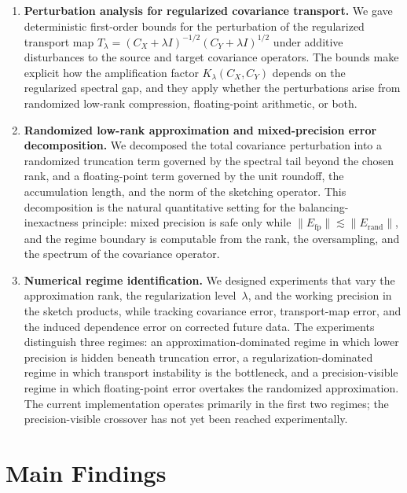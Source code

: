 \begin{enumerate}
	\item \textbf{Perturbation analysis for regularized covariance transport.}
	      We gave deterministic first-order bounds for the perturbation of the
	      regularized transport map
	      \(T_\lambda = (C_X + \lambda I)^{-1/2}(C_Y + \lambda I)^{1/2}\)
	      under additive disturbances to the source and target covariance
	      operators. The bounds make explicit how the amplification factor
	      \(K_\lambda(C_X,C_Y)\) depends on the regularized spectral gap, and
	      they apply whether the perturbations arise from randomized low-rank
	      compression, floating-point arithmetic, or both.

	\item \textbf{Randomized low-rank approximation and mixed-precision error
		      decomposition.}
	      We decomposed the total covariance perturbation into a randomized
	      truncation term governed by the spectral tail beyond the chosen rank,
	      and a floating-point term governed by the unit roundoff, the
	      accumulation length, and the norm of the sketching operator. This
	      decomposition is the natural quantitative setting for the
	      balancing-inexactness principle: mixed precision is safe only while
	      \(\|E_{\mathrm{fp}}\| \lesssim \|E_{\mathrm{rand}}\|\), and the
	      regime boundary is computable from the rank, the oversampling, and
	      the spectrum of the covariance operator.

	\item \textbf{Numerical regime identification.}
	      We designed experiments that vary the approximation rank, the
	      regularization level~\(\lambda\), and the working precision in the
	      sketch products, while tracking covariance error, transport-map error,
	      and the induced dependence error on corrected future data. The
	      experiments distinguish three regimes: an approximation-dominated
	      regime in which lower precision is hidden beneath truncation error, a
	      regularization-dominated regime in which transport instability is the
	      bottleneck, and a precision-visible regime in which floating-point
	      error overtakes the randomized approximation. The current
	      implementation operates primarily in the first two regimes; the
	      precision-visible crossover has not yet been reached experimentally.
\end{enumerate}

\section*{Main Findings}

